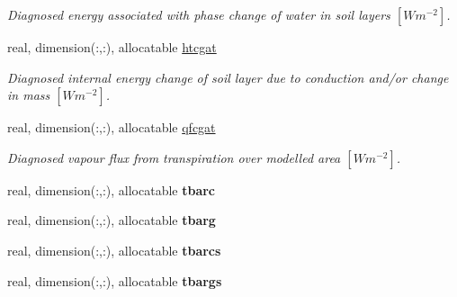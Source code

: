\begin{DoxyCompactItemize}
\begin{DoxyCompactList}\small\item\em Diagnosed energy associated with phase change of water in soil layers $[W m^{-2} ]$. \end{DoxyCompactList}\item 
\hypertarget{structclass__statevars_1_1class__gather_a3151c1adb27defbc62ba8925ced3e7ff}{}real, dimension(\+:,\+:), allocatable \hyperlink{structclass__statevars_1_1class__gather_a3151c1adb27defbc62ba8925ced3e7ff}{htcgat}\label{structclass__statevars_1_1class__gather_a3151c1adb27defbc62ba8925ced3e7ff}

\begin{DoxyCompactList}\small\item\em Diagnosed internal energy change of soil layer due to conduction and/or change in mass $[W m^{-2} ]$. \end{DoxyCompactList}\item 
\hypertarget{structclass__statevars_1_1class__gather_adde51684f1d879c9336425d250abb073}{}real, dimension(\+:,\+:), allocatable \hyperlink{structclass__statevars_1_1class__gather_adde51684f1d879c9336425d250abb073}{qfcgat}\label{structclass__statevars_1_1class__gather_adde51684f1d879c9336425d250abb073}

\begin{DoxyCompactList}\small\item\em Diagnosed vapour flux from transpiration over modelled area $[W m^{-2} ]$. \end{DoxyCompactList}\item 
\hypertarget{structclass__statevars_1_1class__gather_a34c88d072437cee4c07dc8ff1f1b537d}{}real, dimension(\+:,\+:), allocatable {\bfseries tbarc}\label{structclass__statevars_1_1class__gather_a34c88d072437cee4c07dc8ff1f1b537d}

\item 
\hypertarget{structclass__statevars_1_1class__gather_ae6f0ae2b8d610832dd2c731d1e83a249}{}real, dimension(\+:,\+:), allocatable {\bfseries tbarg}\label{structclass__statevars_1_1class__gather_ae6f0ae2b8d610832dd2c731d1e83a249}

\item 
\hypertarget{structclass__statevars_1_1class__gather_a7f26d5a99f48a8dbb5c9479d3fd3aee9}{}real, dimension(\+:,\+:), allocatable {\bfseries tbarcs}\label{structclass__statevars_1_1class__gather_a7f26d5a99f48a8dbb5c9479d3fd3aee9}

\item 
\hypertarget{structclass__statevars_1_1class__gather_a0b9b9e16126a460294b57b0f30da0609}{}real, dimension(\+:,\+:), allocatable {\bfseries tbargs}\label{structclass__statevars_1_1class__gather_a0b9b9e16126a460294b57b0f30da0609}


\end{DoxyCompactItemize}
